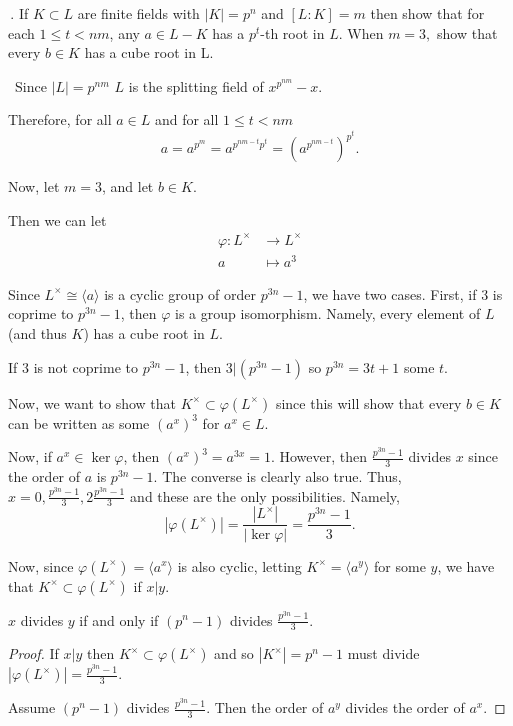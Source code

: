 \documentclass[12pt]{Qual}
\begin{document}
\begin{problem} $\,$.
If $K\subset L$ are finite fields with $|K|=p^n$ and $[L:K]=m$ then show that for each $1\le t<nm$, any $a\in L-K$ has a $p^t$-th root in $L$. When $m=3,$ show that every $b\in K$ has a cube root in L.
\end{problem}


\begin{solution}$\,$
Since $|L|=p^{nm}$ $L$ is the splitting field of $x^{p^{nm}}-x.$

Therefore, for all $a\in L$ and for all $1\le t<nm$ $$a=a^{p^m}=a^{p^{nm-t}p^t}=\left(a^{p^{nm-t}}\right)^{p^t}.$$

Now, let $m=3$, and let $b\in K$.

Then we can let \begin{align*}
    \varphi:L^\times&\to L^\times\\
    a&\mapsto a^3
\end{align*}

Since $L^\times\cong\langle a\rangle$ is a cyclic group of order $p^{3n}-1$, we have two cases. First, if $3$ is coprime to $p^{3n}-1$, then $\varphi$ is a group isomorphism. Namely, every element of $L$ (and thus $K$) has a cube root in $L$.

If $3$ is not coprime to $p^{3n}-1$, then $3|(p^{3n}-1)$ so $p^{3n}=3t+1$ some $t.$

Now, we want to show that $K^\times\subset\varphi(L^\times)$ since this will show that every $b\in K$ can be written as some $(a^x)^3$ for $a^x\in L.$

Now, if $a^x\in\ker\varphi$, then $(a^x)^3=a^{3x}=1$. However, then $\frac{p^{3n}-1}{3}$ divides $x$ since the order of $a$ is $p^{3n}-1$. The converse is clearly also true. Thus, $x=0,\frac{p^{3n}-1}{3},2\frac{p^{3n}-1}{3}$ and these are the only possibilities. Namely, $$|\varphi(L^\times)|=\frac{|L^\times|}{|\ker\varphi|}=\frac{p^{3n}-1}{3}.$$

Now, since $\varphi(L^\times)=\langle a^x\rangle$ is also cyclic, letting $K^\times=\langle a^y\rangle$ for some $y$, we have that $K^\times\subset\varphi(L^\times)$ if $x|y$.

\begin{claim} $x$ divides $y$ if and only if $(p^n-1)$ divides $\frac{p^{3n}-1}{3}$.
\begin{proof} \boxed{\implies} If $x|y$ then $K^\times\subset\varphi(L^\times)$ and so $|K^\times|=p^n-1$ must divide $|\varphi(L^\times)|=\frac{p^{3n}-1}{3}$.

\boxed{\impliedby} Assume $(p^n-1)$ divides $\frac{p^{3n}-1}{3}$. Then the order of $a^y$ divides the order of $a^x$.


\end{proof}
\end{claim}
\end{solution}
\end{document}
